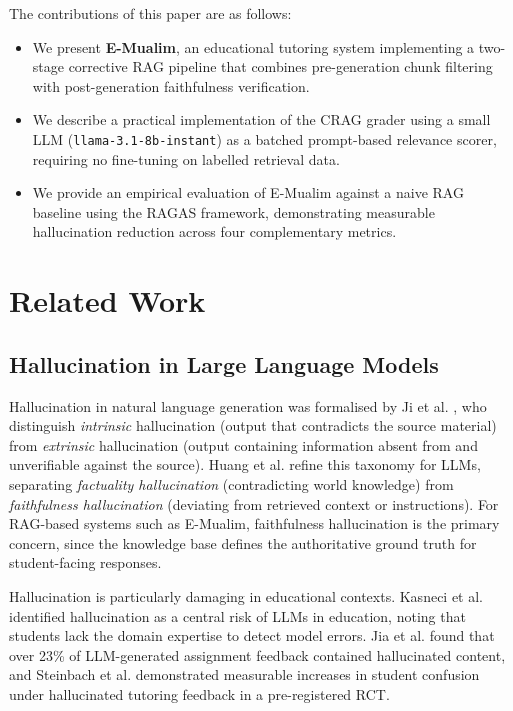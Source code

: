 \documentclass[conference]{IEEEtran}
\begin{document}
The contributions of this paper are as follows:
\begin{itemize}
  \item We present \textbf{E-Mualim}, an educational tutoring system
        implementing a two-stage corrective RAG pipeline that combines
        pre-generation chunk filtering with post-generation faithfulness
        verification.
  \item We describe a practical implementation of the CRAG grader
        using a small LLM (\texttt{llama-3.1-8b-instant}) as a
        batched prompt-based relevance scorer, requiring no
        fine-tuning on labelled retrieval data.
  \item We provide an empirical evaluation of E-Mualim against a
        naive RAG baseline using the RAGAS framework, demonstrating
        measurable hallucination reduction across four complementary
        metrics.
\end{itemize}

\section{Related Work}
\label{sec:related}

\subsection{Hallucination in Large Language Models}

Hallucination in natural language generation was formalised by
Ji et al. \cite{ji2023survey}, who distinguish \emph{intrinsic}
hallucination (output that contradicts the source material) from
\emph{extrinsic} hallucination (output containing information absent
from and unverifiable against the source).
Huang et al. \cite{huang2025survey} refine this taxonomy for
LLMs, separating \emph{factuality hallucination} (contradicting world
knowledge) from \emph{faithfulness hallucination} (deviating from
retrieved context or instructions).
For RAG-based systems such as E-Mualim, faithfulness hallucination
is the primary concern, since the knowledge base defines the
authoritative ground truth for student-facing responses.

Hallucination is particularly damaging in educational contexts.
Kasneci et al. \cite{kasneci2023chatgpt} identified hallucination
as a central risk of LLMs in education, noting that students lack
the domain expertise to detect model errors.
Jia et al. \cite{jia2024faithfulness} found that over 23\% of
LLM-generated assignment feedback contained hallucinated content,
and Steinbach et al. \cite{steinbach2025hallucinate} demonstrated
measurable increases in student confusion under hallucinated tutoring
feedback in a pre-registered RCT.
\end{document}
